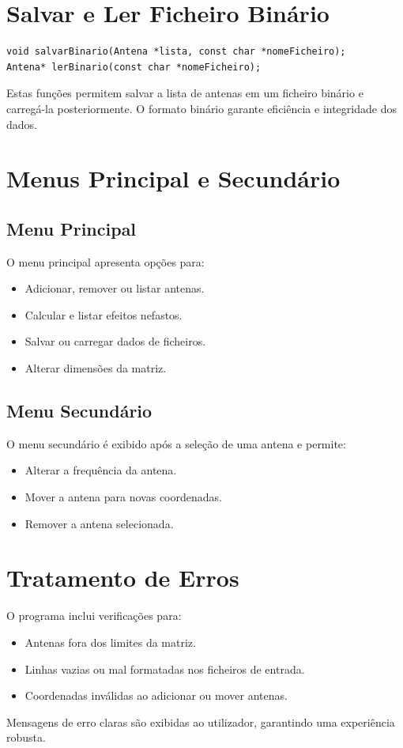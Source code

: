 \documentclass[a4paper,12pt]{report}
\begin{document}
\section{Salvar e Ler Ficheiro Binário}
\begin{lstlisting}[style=CStyle]
void salvarBinario(Antena *lista, const char *nomeFicheiro);
Antena* lerBinario(const char *nomeFicheiro);
\end{lstlisting}
Estas funções permitem salvar a lista de antenas em um ficheiro binário e carregá-la posteriormente. O formato binário garante eficiência e integridade dos dados.

\section{Menus Principal e Secundário}
\subsection{Menu Principal}
O menu principal apresenta opções para:
\begin{itemize}
    \item Adicionar, remover ou listar antenas.
    \item Calcular e listar efeitos nefastos.
    \item Salvar ou carregar dados de ficheiros.
    \item Alterar dimensões da matriz.
\end{itemize}

\subsection{Menu Secundário}
O menu secundário é exibido após a seleção de uma antena e permite:
\begin{itemize}
    \item Alterar a frequência da antena.
    \item Mover a antena para novas coordenadas.
    \item Remover a antena selecionada.
\end{itemize}

\section{Tratamento de Erros}
O programa inclui verificações para:
\begin{itemize}
    \item Antenas fora dos limites da matriz.
    \item Linhas vazias ou mal formatadas nos ficheiros de entrada.
    \item Coordenadas inválidas ao adicionar ou mover antenas.
    \end{itemize}
    Mensagens de erro claras são exibidas ao utilizador, garantindo uma experiência robusta.
    
\end{document}
